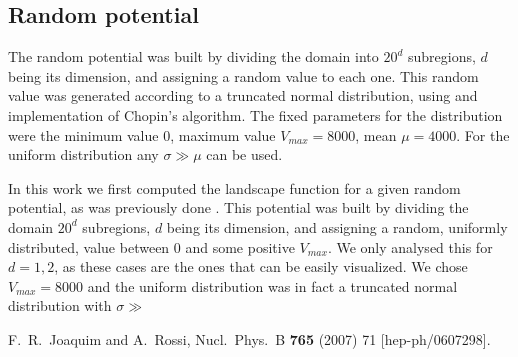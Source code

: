 \documentclass[a4paper,prd,twocolumn,nofootinbib,superscriptaddress,floatfix]{revtex4}
\begin{document}
\subsection{Random potential}

The random potential was built by dividing the domain into $20^d$ subregions, $d$ being its dimension, and assigning a random value to each one. This random value was generated according to a truncated normal distribution, using and implementation of Chopin's algorithm. The fixed parameters for the distribution were the minimum value $0$, maximum value $V_{max}=8000$, mean $\mu=4000$. For the uniform distribution any $\sigma\gg\mu$ can be used.

In this work we first computed the landscape function for a given random potential, as was previously done . This potential was built by dividing the domain $20^d$ subregions, $d$ being its dimension, and assigning a random, uniformly distributed, value between 0 and some positive $V_{max}$. We only analysed this for $d=1,2$, as these cases are the ones that can be easily visualized. We chose $V_{max}=8000$ and the uniform distribution was in fact a truncated normal distribution with $\sigma\gg$

\acknowledgements

\begin{thebibliography}{99}

  F.~R.~Joaquim and A.~Rossi,
  Nucl.\ Phys.\ B {\bf 765} (2007) 71
  [hep-ph/0607298].

\end{thebibliography}
\end{document}
